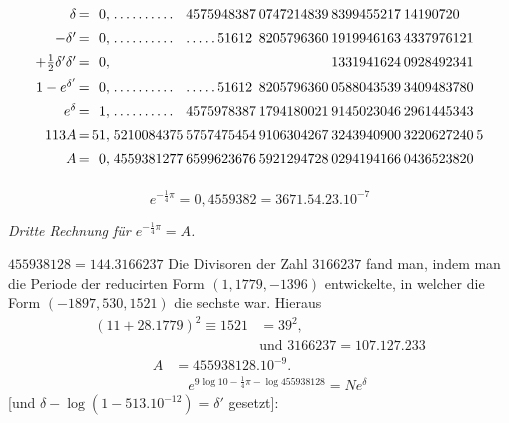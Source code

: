 \begingroup\footnotesize\setlength{\arraycolsep}{1pt}\renewcommand{\arraystretch}{1.12}\[
\begin{array}{r@{\,=\,}r@{\;}l@{\hspace{2pt}}l@{\hspace{2pt}}l@{\hspace{2pt}}l@{\hspace{2pt}}l@{\hspace{2pt}}l}
\delta & 0{,} & .\,.\,.\,.\,.\,.\,.\,.\,.\,. & 4575948387 & 0747214839 & 8399455217 & 14190720 & \\[5pt]
-\delta' & 0{,} & .\,.\,.\,.\,.\,.\,.\,.\,.\,. & .\,.\,.\,.\,.\,51612 & 8205796360 & 1919946163 & 4337976121 & \\[5pt]
+\tfrac12\delta'\delta' & 0{,} &  &  &  & 1331941624 & 0928492341 & \\[5pt]
1-e^{\delta'} & 0{,} & .\,.\,.\,.\,.\,.\,.\,.\,.\,. & .\,.\,.\,.\,.\,51612 & 8205796360 & 0588043539 & 3409483780 & \\[5pt]
e^\delta & 1{,} & .\,.\,.\,.\,.\,.\,.\,.\,.\,. & 4575978387 & 1794180021 & 9145023046 & 2961445343 & \\[5pt]
113A & 51{,} & 5210084375 & 5757475454 & 9106304267 & 3243940900 & 3220627240 & 5\\[5pt]
A & 0{,} & 4559381277 & 6599623676 & 5921294728 & 0294194166 & 0436523820 & \\[5pt]
\end{array}
\]\endgroup

\[
e^{-\frac14\pi}=0{,}4559382=3671.54.23.10^{-7}
\]

\begin{center}\emph{Dritte Rechnung für $e^{-\frac14\pi}=A$.}\end{center}

$455938128=144.3166237$ Die Divisoren der Zahl $3166237$ fand man, indem man die Periode der reducirten Form
$(1,1779,-1396)$ entwickelte, in welcher die Form $(-1897,530,1521)$ die sechste war. Hieraus
\[
\begin{aligned}(11+28.1779)^2\equiv1521&=39^2,\\[6pt]&\text{und }3166237=107.127.233\end{aligned}
\]
\[
\begin{aligned}A&=455938128.10^{-9}.\\[7pt]&\quad{}e^{9\log10-\frac14\pi-\log455938128}=Ne^\delta\end{aligned}
\]
[und $\delta-\log(1-513.10^{-12})=\delta'$ gesetzt]:

